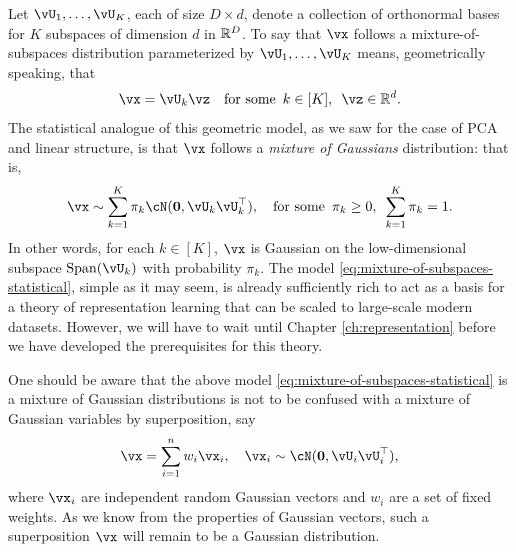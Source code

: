 \documentclass[../../book-main.tex]{subfiles}
\begin{document}
Let $\vU_1, \dots, \vU_K$, each of size $D \times d$, denote a collection of orthonormal bases for $K$ subspaces of dimension $d$ in $\mathbb{R}^D$.
To say that $\vx$ follows a mixture-of-subspaces distribution parameterized by $\vU_1, \dots, \vU_K$ means, geometrically speaking,
that 
\begin{equation}\label{eq:mixture-of-subspaces-geometric}
    \vx = \vU_k \vz  \quad \text{for some} \enspace k \in [K],\enspace \vz \in \R^d.
\end{equation}
The statistical analogue of this geometric model, as we saw for the case of PCA and linear structure,
is that $\vx$ follows a \textit{mixture of Gaussians} distribution: that is,
\begin{equation}\label{eq:mixture-of-subspaces-statistical}
    \vx \sim \sum_{k=1}^K \pi_k \cN(\mathbf{0}, \vU_k\vU_k^\top), \quad \text{for some} \enspace \pi_k \geq 0,\enspace \sum_{k=1}^K \pi_k = 1.
\end{equation}
In other words, for each $k \in [K]$, $\vx$ is Gaussian on the low-dimensional subspace $\Span(\vU_k)$  with probability $\pi_k$.
The model \eqref{eq:mixture-of-subspaces-statistical}, simple as it may seem, is already sufficiently rich to act as a basis for a theory of representation learning that can be scaled to large-scale modern datasets. However, we will have to wait until Chapter \ref{ch:representation} before we have developed the prerequisites for this theory. 

\begin{remark}
One should be aware that the above model \eqref{eq:mixture-of-subspaces-statistical} is a mixture of Gaussian distributions is not to be confused with a mixture of Gaussian variables by superposition, say 
\begin{equation}
    \vx = \sum_{i=1}^n w_i \vx_i, \quad \vx_i \sim \cN(\mathbf{0}, \vU_i\vU_i^\top),
\end{equation}
where $\vx_i$ are independent random Gaussian vectors and $w_i$ are a set of fixed weights. As we know from the properties of Gaussian vectors, such a superposition $\vx$ will remain to be a Gaussian distribution.
\end{remark}
\end{document}
